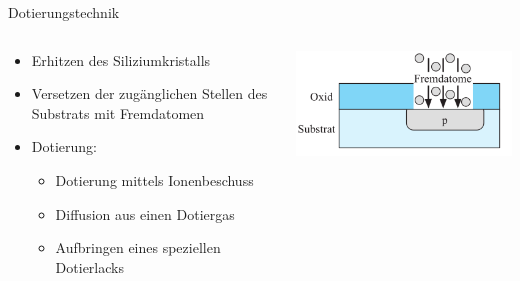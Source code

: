 \documentclass[12pt%
,aspectratio=169%
]{beamer}
\begin{document}
\begin{frame}{Dotierungstechnik}
\begin{columns}[T] %
\begin{column}{.58\textwidth}
\begin{itemize}
	\item Erhitzen des Siliziumkristalls
	\item Versetzen der zugänglichen Stellen des Substrats mit Fremdatomen
	\item Dotierung:
	\begin{itemize}
		\item Dotierung mittels Ionenbeschuss
		\item Diffusion aus einen Dotiergas
		\item Aufbringen eines speziellen Dotierlacks
	\end{itemize}
\end{itemize}
\end{column}%
\hfill%
\begin{column}{.38\textwidth}
\centering
\vspace*{-1cm}
\includegraphics[scale=0.45]{pictures/dotierung}
\end{column}%
\end{columns}
\end{frame}
\end{document}
